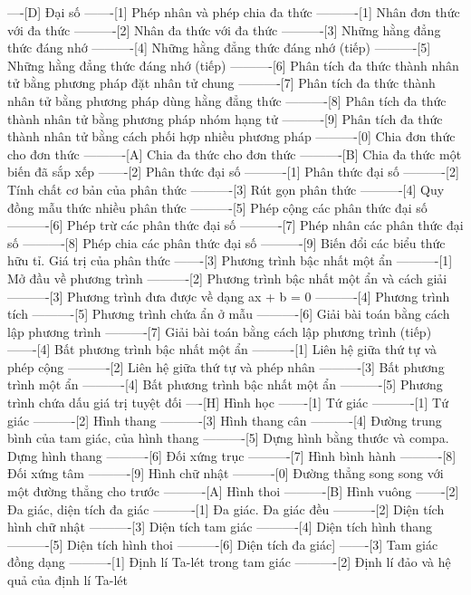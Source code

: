 ----[D] Đại số
-------[1] Phép nhân và phép chia đa thức
----------[1] Nhân đơn thức với đa thức
----------[2] Nhân đa thức với đa thức
----------[3] Những hằng đẳng thức đáng nhớ
----------[4] Những hằng đẳng thức đáng nhớ (tiếp)
----------[5] Những hằng đẳng thức đáng nhớ (tiếp)
----------[6] Phân tích đa thức thành nhân tử bằng phương pháp đặt nhân tử chung
----------[7] Phân tích đa thức thành nhân tử bằng phương pháp dùng hằng đẳng thức
----------[8] Phân tích đa thức thành nhân tử bằng phương pháp nhóm hạng tử
----------[9] Phân tích đa thức thành nhân tử bằng cách phối hợp nhiều phương pháp
----------[0] Chia đơn thức cho đơn thức
----------[A] Chia đa thức cho đơn thức
----------[B] Chia đa thức một biến đã sắp xếp
-------[2] Phân thức đại số
----------[1] Phân thức đại số
----------[2] Tính chất cơ bản của phân thức
----------[3] Rút gọn phân thức
----------[4] Quy đồng mẫu thức nhiều phân thức
----------[5] Phép cộng các phân thức đại số
----------[6] Phép trừ các phân thức đại số
----------[7] Phép nhân các phân thức đại số
----------[8] Phép chia các phân thức đại số
----------[9] Biến đổi các biểu thức hữu tỉ. Giá trị của phân thức
-------[3] Phương trình bậc nhất một ẩn
----------[1] Mở đầu về phương trình
----------[2] Phương trình bậc nhất một ẩn và cách giải
----------[3] Phương trình đưa được về dạng ax + b = 0
----------[4] Phương trình tích
----------[5] Phương trình chứa ẩn ở mẫu
----------[6] Giải bài toán bằng cách lập phương trình
----------[7] Giải bài toán bằng cách lập phương trình (tiếp)
-------[4] Bất phương trình bậc nhất một ẩn
----------[1] Liên hệ giữa thứ tự và phép cộng
----------[2] Liên hệ giữa thứ tự và phép nhân
----------[3] Bất phương trình một ẩn
----------[4] Bất phương trình bậc nhất một ẩn
----------[5] Phương trình chứa dấu giá trị tuyệt đối
----[H] Hình học
-------[1] Tứ giác
----------[1] Tứ giác
----------[2] Hình thang
----------[3] Hình thang cân
----------[4] Đường trung bình của tam giác, của hình thang
----------[5] Dựng hình bằng thước và compa. Dựng hình thang
----------[6] Đối xứng trục
----------[7] Hình bình hành
----------[8] Đối xứng tâm
----------[9] Hình chữ nhật
----------[0] Đường thẳng song song với một đường thẳng cho trước
----------[A] Hình thoi
----------[B] Hình vuông
-------[2] Đa giác, diện tích đa giác
----------[1] Đa giác. Đa giác đều
----------[2] Diện tích hình chữ nhật
----------[3] Diện tích tam giác
----------[4] Diện tích hình thang
----------[5] Diện tích hình thoi
----------[6] Diện tích đa giác]
-------[3] Tam giác đồng dạng
----------[1] Định lí Ta-lét trong tam giác
----------[2] Định lí đảo và hệ quả của định lí Ta-lét
